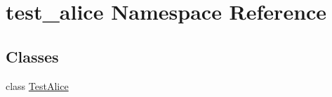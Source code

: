\hypertarget{namespacetest__alice}{}\section{test\+\_\+alice Namespace Reference}
\label{namespacetest__alice}
\subsection*{Classes}
\begin{DoxyCompactItemize}
\item 
class \hyperlink{classtest__alice_1_1TestAlice}{Test\+Alice}
\end{DoxyCompactItemize}
